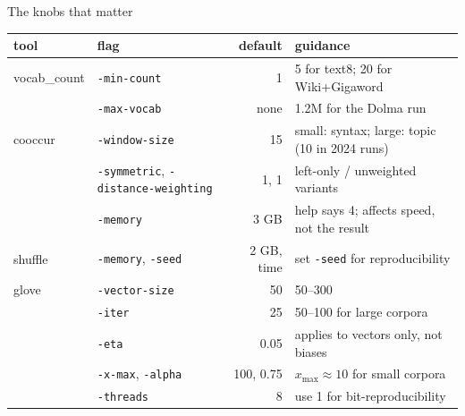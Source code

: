\documentclass[aspectratio=169,11pt]{beamer}
\newcommand{\opt}[1]{\texttt{-#1}}
\begin{document}
\begin{frame}{The knobs that matter}
\scriptsize
\begin{tabular}{@{}llrp{58mm}@{}}
\toprule
tool & flag & default & guidance\\
\midrule
vocab\_count & \opt{min-count} & 1 & 5 for text8; 20 for Wiki+Gigaword\\
             & \opt{max-vocab} & none & 1.2M for the Dolma run\\
\midrule
cooccur & \opt{window-size} & 15 & small: syntax; large: topic (10 in 2024 runs)\\
        & \opt{symmetric}, \opt{distance-weighting} & 1, 1 & left-only / unweighted variants\\
        & \opt{memory} & 3 GB & help says 4; affects speed, not the result\\
\midrule
shuffle & \opt{memory}, \opt{seed} & 2 GB, time & set \opt{seed} for reproducibility\\
\midrule
glove & \opt{vector-size} & 50 & 50--300\\
      & \opt{iter} & 25 & 50--100 for large corpora\\
      & \opt{eta} & 0.05 & applies to vectors only, not biases\\
      & \opt{x-max}, \opt{alpha} & 100, 0.75 & $x_{\max}\approx 10$ for small corpora\\
      & \opt{threads} & 8 & use 1 for bit-reproducibility\\
\bottomrule
\end{tabular}
\end{frame}
\end{document}
